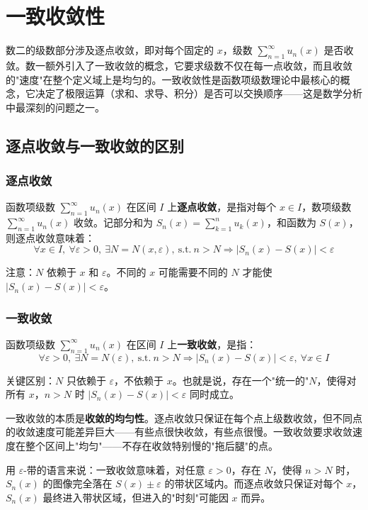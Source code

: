 
\section{一致收敛性}

数二的级数部分涉及逐点收敛，即对每个固定的 $x$，级数 $\sum_{n=1}^\infty u_n(x)$ 是否收敛。数一额外引入了一致收敛的概念，它要求级数不仅在每一点收敛，而且收敛的"速度"在整个定义域上是均匀的。一致收敛性是函数项级数理论中最核心的概念，它决定了极限运算（求和、求导、积分）是否可以交换顺序——这是数学分析中最深刻的问题之一。

\subsection{逐点收敛与一致收敛的区别}

\subsubsection{逐点收敛}

函数项级数 $\sum_{n=1}^\infty u_n(x)$ 在区间 $I$ 上\textbf{逐点收敛}，是指对每个 $x\in I$，数项级数 $\sum_{n=1}^\infty u_n(x)$ 收敛。记部分和为 $S_n(x) = \sum_{k=1}^n u_k(x)$，和函数为 $S(x)$，则逐点收敛意味着：
\[
\forall x\in I,\ \forall\varepsilon>0,\ \exists N=N(x,\varepsilon),\ \text{s.t.}\ n>N \Rightarrow |S_n(x)-S(x)|<\varepsilon
\]

注意：$N$ 依赖于 $x$ 和 $\varepsilon$。不同的 $x$ 可能需要不同的 $N$ 才能使 $|S_n(x)-S(x)|<\varepsilon$。

\subsubsection{一致收敛}

函数项级数 $\sum_{n=1}^\infty u_n(x)$ 在区间 $I$ 上\textbf{一致收敛}，是指：
\[
\forall\varepsilon>0,\ \exists N=N(\varepsilon),\ \text{s.t.}\ n>N \Rightarrow |S_n(x)-S(x)|<\varepsilon,\ \forall x\in I
\]

关键区别：$N$ 只依赖于 $\varepsilon$，不依赖于 $x$。也就是说，存在一个"统一的"$N$，使得对所有 $x$，$n>N$ 时 $|S_n(x)-S(x)|<\varepsilon$ 同时成立。

\begin{essencebox}
一致收敛的本质是\textbf{收敛的均匀性}。逐点收敛只保证在每个点上级数收敛，但不同点的收敛速度可能差异巨大——有些点很快收敛，有些点很慢。一致收敛要求收敛速度在整个区间上"均匀"——不存在收敛特别慢的"拖后腿"的点。

用 $\varepsilon$-带的语言来说：一致收敛意味着，对任意 $\varepsilon>0$，存在 $N$，使得 $n>N$ 时，$S_n(x)$ 的图像完全落在 $S(x)\pm\varepsilon$ 的带状区域内。而逐点收敛只保证对每个 $x$，$S_n(x)$ 最终进入带状区域，但进入的"时刻"可能因 $x$ 而异。
\end{essencebox}

